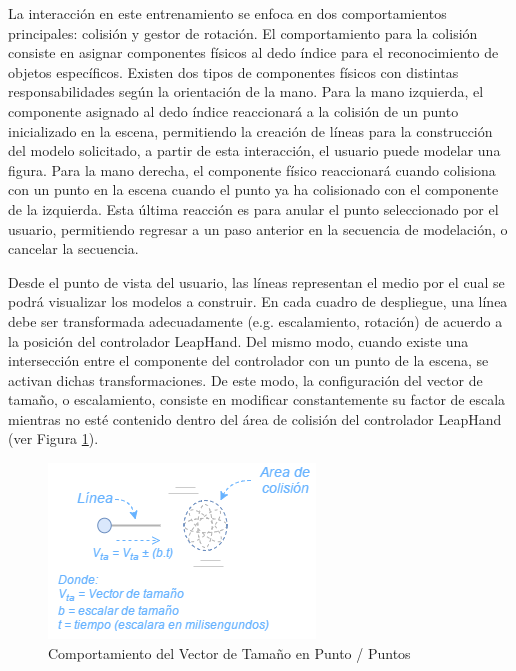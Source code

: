 \documentclass[conference]{IEEEtran}
\begin{document}
La interacción en este entrenamiento se enfoca en dos comportamientos principales: colisión y gestor de rotación. El comportamiento para la colisión consiste en asignar componentes físicos al dedo índice para el reconocimiento de objetos específicos. Existen dos tipos de componentes físicos con distintas responsabilidades según la orientación de la mano. Para la mano izquierda, el componente asignado al dedo índice reaccionará a la colisión de un punto inicializado en la escena, permitiendo la creación de líneas para la construcción del modelo solicitado, a partir de esta interacción, el usuario puede modelar una figura. Para la mano derecha, el componente físico reaccionará cuando colisiona con un punto en la escena cuando el punto ya ha colisionado con el componente de la izquierda. Esta última reacción es para anular el punto seleccionado por el usuario, permitiendo regresar a un paso anterior en la secuencia de modelación, o cancelar la secuencia. 

Desde el punto de vista del usuario, las líneas representan el medio por el cual se podrá visualizar los modelos a construir. En cada cuadro de despliegue, una línea debe ser transformada adecuadamente (e.g. escalamiento, rotación) de acuerdo a la posición del controlador LeapHand. Del mismo modo, cuando existe una intersección entre el componente del controlador con un punto de la escena, se activan dichas transformaciones. De este modo, la configuración del vector de tamaño, o escalamiento, consiste en modificar constantemente su factor de escala mientras no esté contenido dentro del área de colisión del controlador LeapHand (ver Figura \ref{fig:comtam}).

\begin{figure}[htpb!]
 \centering 
\includegraphics[width=0.80\columnwidth]{images/comtam.png}
\caption{Comportamiento del Vector de Tama\~no en Punto / Puntos}
\label{fig:comtam}
\end{figure}
\end{document}

